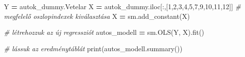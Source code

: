 \documentclass[
]{book}
\newenvironment{Shaded}{\begin{snugshade}}{\end{snugshade}}
\newcommand{\BuiltInTok}[1]{#1}
\newcommand{\CommentTok}[1]{\textcolor[rgb]{0.56,0.35,0.01}{\textit{#1}}}
\newcommand{\DecValTok}[1]{\textcolor[rgb]{0.00,0.00,0.81}{#1}}
\newcommand{\NormalTok}[1]{#1}
\newcommand{\OperatorTok}[1]{\textcolor[rgb]{0.81,0.36,0.00}{\textbf{#1}}}
\begin{document}
\begin{Shaded}
\begin{Highlighting}[]
\NormalTok{Y }\OperatorTok{=}\NormalTok{ autok\_dummy.Vetelar}
\NormalTok{X }\OperatorTok{=}\NormalTok{ autok\_dummy.iloc[:,[}\DecValTok{1}\NormalTok{,}\DecValTok{2}\NormalTok{,}\DecValTok{3}\NormalTok{,}\DecValTok{4}\NormalTok{,}\DecValTok{5}\NormalTok{,}\DecValTok{7}\NormalTok{,}\DecValTok{9}\NormalTok{,}\DecValTok{10}\NormalTok{,}\DecValTok{11}\NormalTok{,}\DecValTok{12}\NormalTok{]] }\CommentTok{\# megfelelő oszlopindexek kiválasztása}
\NormalTok{X }\OperatorTok{=}\NormalTok{ sm.add\_constant(X)}

\CommentTok{\# létrehozzuk az új regressziót}
\NormalTok{autos\_modell }\OperatorTok{=}\NormalTok{ sm.OLS(Y, X).fit()}

\CommentTok{\# lássuk az eredménytáblát}
\BuiltInTok{print}\NormalTok{(autos\_modell.summary())}
\end{Highlighting}
\end{Shaded}
\end{document}
